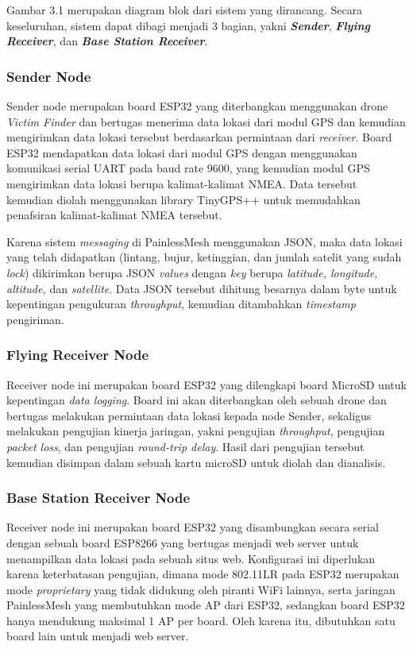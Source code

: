 Gambar 3.1 merupakan diagram blok dari sistem yang dirancang. Secara keseluruhan, sistem dapat dibagi menjadi 3 bagian, yakni \textbf{\textit{Sender}}, \textbf{\textit{Flying Receiver}}, dan \textbf{\textit{Base Station Receiver}}.
\subsubsection{Sender Node}
Sender node merupakan board ESP32 yang diterbangkan menggunakan drone \textit{Victim Finder} dan bertugas menerima data lokasi dari modul GPS dan kemudian mengirimkan data lokasi tersebut berdasarkan permintaan dari \textit{receiver}. Board ESP32 mendapatkan data lokasi dari modul GPS dengan menggunakan komunikasi serial UART pada baud rate 9600, yang kemudian modul GPS mengirimkan data lokasi berupa kalimat-kalimat NMEA. Data tersebut kemudian diolah menggunakan library TinyGPS++ untuk memudahkan penafsiran kalimat-kalimat NMEA tersebut.

Karena sistem \textit{messaging} di PainlessMesh menggunakan JSON, maka data lokasi yang telah didapatkan (lintang, bujur, ketinggian, dan jumlah satelit yang sudah \textit{lock}) dikirimkan berupa JSON \textit{values} dengan \textit{key} berupa \textit{latitude, longitude, altitude,} dan \textit{satellite}. Data JSON tersebut dihitung besarnya dalam byte untuk kepentingan pengukuran \textit{throughput}, kemudian ditambahkan \textit{timestamp} pengiriman.

\subsubsection{Flying Receiver Node}
Receiver node ini merupakan board ESP32 yang dilengkapi board MicroSD untuk kepentingan \textit{data logging}. Board ini akan diterbangkan oleh sebuah drone dan bertugas melakukan permintaan data lokasi kepada node Sender, sekaligus melakukan pengujian kinerja jaringan, yakni pengujian \textit{throughput}, pengujian \textit{packet loss}, dan pengujian \textit{round-trip delay}. Hasil dari pengujian tersebut kemudian disimpan dalam sebuah kartu microSD untuk diolah dan dianalisis.

\subsubsection{Base Station Receiver Node}
Receiver node ini merupakan board ESP32 yang disambungkan secara serial dengan sebuah board ESP8266 yang bertugas menjadi web server untuk menampilkan data lokasi pada sebuah situs web. Konfigurasi ini diperlukan karena keterbatasan pengujian, dimana mode 802.11LR pada ESP32 merupakan mode \textit{proprietary} yang tidak didukung oleh piranti WiFi lainnya, serta jaringan PainlessMesh yang membutuhkan mode AP dari ESP32, sedangkan board ESP32 hanya mendukung maksimal 1 AP per board. Oleh karena itu, dibutuhkan satu board lain untuk menjadi web server.


